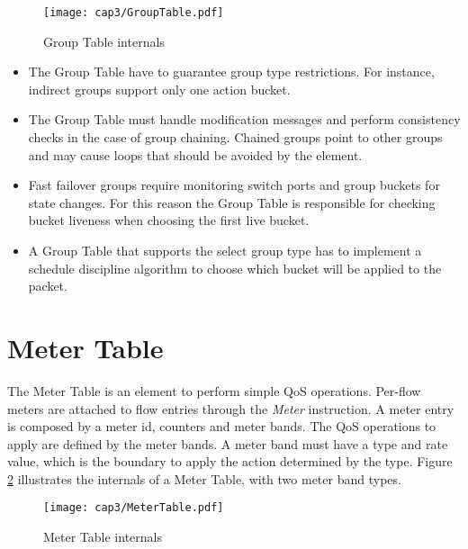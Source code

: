 	\begin{figure}[H]
    \centering
    \texttt{[image: cap3/GroupTable.pdf]}
    \caption{Group Table internals}
    \label{fig:grouptable}
    \end{figure}

	\begin{itemize}
	
	\item The Group Table have to guarantee group type restrictions. For instance, indirect groups support only one action bucket. 

	\item The Group Table must handle modification messages and perform consistency checks in the case of group chaining. Chained groups point to other groups and may cause loops that should be avoided by the element.  

	\item Fast failover groups require monitoring switch ports and group buckets for state changes. For this reason the Group Table is responsible for checking bucket liveness when choosing the first live bucket.

	\item A Group Table that supports the select group type has to implement a schedule discipline algorithm to choose which bucket will be applied to the packet.

	\end{itemize}

	\section{Meter Table}
	\label{sec:MeterTable}

    The Meter Table is an element to perform simple QoS operations. Per-flow meters are attached to flow entries through the \textit{Meter} instruction. A meter entry is composed by a meter id, counters and meter bands. The QoS operations to apply are defined by the meter bands. A meter band must have a type and rate value, which is the boundary to apply the action determined by the type. Figure \ref{fig:metertable} illustrates the internals of a Meter Table, with two meter band types.   

    \begin{figure}[H]
    \centering
    \texttt{[image: cap3/MeterTable.pdf]}
    \caption{Meter Table internals}
    \label{fig:metertable}
    \end{figure}

